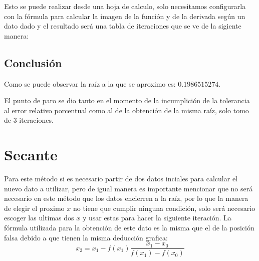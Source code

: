 \documentclass{article}
\begin{document}
Esto se puede realizar desde una hoja de calculo, solo necesitamos configurarla con la fórmula para calcular la imagen 
de la función y de la derivada según un dato dado y el resultado será una tabla de iteraciones que se ve de la sigiente
manera:
\begin{table}[h]
    \begin{center}
    \end{center}
    
\end{table}

\subsection*{Conclusión}
Como se puede observar la raíz a la que se aproximo es: $0.1986515274$. 

El punto de paro se dio tanto en el momento de la incumplición de la tolerancia al error relativo porcentual como al de la 
obtención de la misma raíz, solo tomo de 3 iteraciones. 

\section{Secante}
Para este método si es necesario partir de dos datos inciales para calcular el nuevo dato a utilizar, pero de igual manera 
es importante mencionar que no será necesario en este método que los datos encierren a la raíz, por lo que la manera de 
elegir el proximo $x$ no tiene que cumplir ninguna condición, solo será necesario escoger las ultimas dos $x$ y usar estas 
para hacer la siguiente iteración. La fórmula utilizada para la obtención de este dato es la misma que el de la posición 
falsa debido a que tienen la misma deducción grafica: $$x_2=x_1-f(x_1)\frac{x_1-x_0}{f(x_1)-f(x_0)}$$
\end{document}

